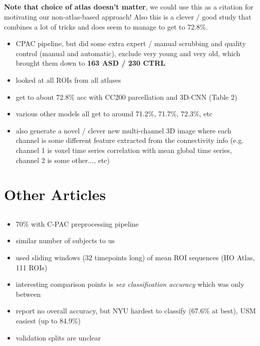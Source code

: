 \documentclass[10pt]{article}
\begin{document}
\subsection{\citet{khoslaEnsembleLearning3D2019}}
\textbf{Note that choice of atlas doesn't matter}, we could use this as a citation for motivating
our non-atlas-based approach! Also this is a clever / good study that combines a lot of tricks and does seem to manage to get to 72.8\%.
\begin{itemize}
  \item CPAC pipeline, but did some extra expert / manual scrubbing and quality control (manual and
  automatic), exclude very young and very old, which brought them down to  \textbf{163 ASD / 230
  CTRL}
  \item looked at all ROIs from all atlases
  \item get to about 72.8\% acc with CC200 parcellation and 3D-CNN (Table 2)
  \item various other models all get to around 71.2\%, 71.7\%, 72.3\%, etc
  \item also generate a novel / clever new multi-channel 3D image where each channel is some different
  feature extracted from the connectivity info (e.g. channel 1 is voxel time series correlation with mean global time series, channel 2 is some other..., etc)
\end{itemize}

\section{Other Articles} \label{other-articles}


\subsection{\citet{liMultisiteFMRIAnalysis2020}}

\begin{itemize}
  \item 70\% with C-PAC preprocessing pipeline
  \item similar number of subjects to us
  \item used sliding windows (32 timepoints long) of mean ROI sequences (HO Atlas, 111 ROIs)
  \item interesting comparison points is \emph{sex classification accuracy} which was only between
  \item report no overall accuracy, but NYU hardest to classify (67.6\% at best), USM easiest (up to
  84.9\%)
  \item validation splits are unclear
\end{itemize}
\end{document}
